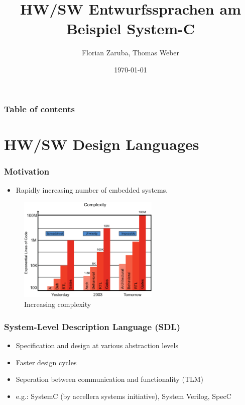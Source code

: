 \documentclass{beamer}
\begin{document}
\title[Entwurssprachen]{HW/SW Entwurfssprachen am Beispiel System-C}
\author[Zaruba F., Weber T.]{Florian Zaruba, Thomas Weber}
\date{\today} 

\begin{frame}
\titlepage
\end{frame}

\begin{frame}\frametitle{Table of contents}
  \tableofcontents
\end{frame}


\section{HW/SW Design Languages} 

\begin{frame}\frametitle{Motivation} 

\begin{itemize}
	\item Rapidly increasing number of embedded systems.
\end{itemize}
	    \begin{figure}[hp]
		  \includegraphics[width=0.6\textwidth]{pictures/complexity.pdf}
	      \caption{Increasing complexity \cite{black2004systemc}}
	      \label{fig:flow}
	    \end{figure} 
\end{frame}

\begin{frame}\frametitle{System-Level Description Language (SDL)} 
\begin{itemize}
	\item Specification and design at various abstraction levels
	\item Faster design cycles %
	\item Seperation between communication and functionality (TLM)
	\item e.g.: SystemC (by accellera systems initiative), System Verilog, SpecC
\end{itemize}
\end{frame}
\end{document}
